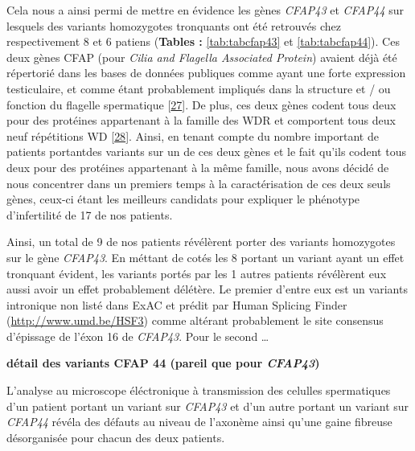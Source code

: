 \documentclass[12pt,twoside]{reedthesis}
\theoremstyle{definition}
\theoremstyle{definition}
\theoremstyle{remark}
\begin{document}
  Cela nous a ainsi permi de mettre en évidence les gènes \emph{CFAP43} et
  \emph{CFAP44} sur lesquels des variants homozygotes tronquants ont été
  retrouvés chez respectivement 8 et 6 patiens (\textbf{Tables :
  }\ref{tab:tabcfap43} et \ref{tab:tabcfap44}). Ces deux gènes CFAP (pour
  \emph{Cilia and Flagella Associated Protein}) avaient déjà été
  répertorié dans les bases de données publiques comme ayant une forte
  expression testiculaire, et comme étant probablement impliqués dans la
  structure et / ou fonction du flagelle spermatique
  {[}\protect\hyperlink{ref-Ivliev2012}{27}{]}. De plus, ces deux gènes
  codent tous deux pour des protéines appartenant à la famille des WDR et
  comportent tous deux neuf répétitions WD
  {[}\protect\hyperlink{ref-Smith2008}{28}{]}. Ainsi, en tenant compte du
  nombre important de patients portantdes variants sur un de ces deux
  gènes et le fait qu'ils codent tous deux pour des protéines appartenant
  à la même famille, nous avons décidé de nous concentrer dans un premiers
  temps à la caractérisation de ces deux seuls gènes, ceux-ci étant les
  meilleurs candidats pour expliquer le phénotype d'infertilité de 17 de
  nos patients.
  
  Ainsi, un total de 9 de nos patients révélèrent porter des variants
  homozygotes sur le gène \emph{CFAP43}. En méttant de cotés les 8 portant
  un variant ayant un effet tronquant évident, les variants portés par les
  1 autres patients révélèrent eux aussi avoir un effet probablement
  délétère. Le premier d'entre eux est un variants intronique non listé
  dans ExAC et prédit par Human Splicing Finder
  (\url{http://www.umd.be/HSF3}) comme altérant probablement le site
  consensus d'épissage de l'éxon 16 de \emph{CFAP43}. Pour le second
  \ldots{}
  
  \textbf{détail des variants CFAP 44 (pareil que pour \emph{CFAP43})}
  
  L'analyse au microscope éléctronique à transmission des celulles
  spermatiques d'un patient portant un variant sur \emph{CFAP43} et d'un
  autre portant un variant sur \emph{CFAP44} révéla des défauts au niveau
  de l'axonème ainsi qu'une gaine fibreuse désorganisée pour chacun des
  deux patients.
  
\end{document}
